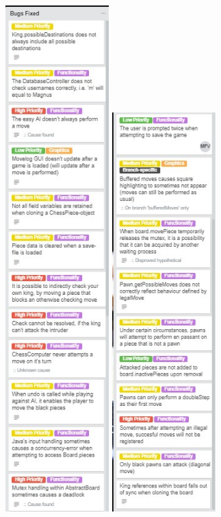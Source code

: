 \documentclass{article}
\begin{document}
\includegraphics[width=4cm]{20180503-bugxfixed1.jpg}
\includegraphics[width=4cm]{20180503-bugxfixed2.jpg}
\end{document}
